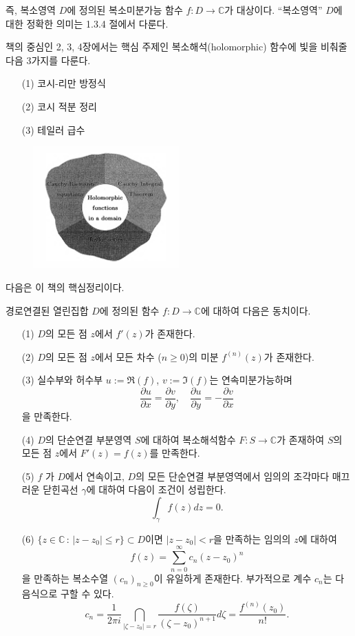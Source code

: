 즉, 복소영역 $D$에 정의된 복소미분가능 함수 $f \colon D\to \mathbb C$가 대상이다.
``복소영역'' $D$에 대한 정확한 의미는 1.3.4 절에서 다룬다.

책의 중심인 2, 3, 4장에서는 
핵심 주제인 복소해석(holomorphic) 함수에 빛을 비춰줄 다음 3가지를 다룬다.
\begin{enumerate}
\item[(1)] 코시-리만 방정식
\item[(2)] 코시 적분 정리
\item[(3)] 테일러 급수
\end{enumerate}

\begin{figure}[!h]
\begin{center}
\includegraphics[width=0.5\textwidth]{./SaltChapter/preface-fig-0-4}
\end{center}
\end{figure}

다음은 이 책의 핵심정리이다.

\begin{salt_theorem}
경로연결된 열린집합 $D$에 정의된 함수
$f:D\to \mathbb C$에 대하여 다음은 동치이다.
\begin{itemize}
\item[(1)] $D$의 모든 점 $z$에서 $f'(z)$가 존재한다.
\item[(2)] $D$의 모든 점 $z$에서 모든 차수 ($n\ge0$)의 미분  $f^{(n)}(z)$가 존재한다.
\item[(3)] 실수부와 허수부 $u:=\Re(f)$, $v:=\Im(f)$는 연속미분가능하며 
$$
\frac{\partial u}{\partial x} = \frac{\partial v}{\partial y},
\quad
\frac{\partial u}{\partial y} = - \frac{\partial v}{\partial x}
$$
을 만족한다.
\item[(4)] $D$의 단순연결 부분영역 $S$에 대하여 
복소해석함수 $ F: S\to \mathbb C$가 존재하여
$S$의 모든 점 $z$에서 $F'(z)= f(z)$를 만족한다.
\item[(5)] $ f$ 가 $D$에서 연속이고, 
$D$의 모든 단순연결 부분영역에서
임의의 조각마다 매끄러운 닫힌곡선 $\gamma$에 대하여 다음이 조건이 성립한다.
$$
\int_\gamma f(z)dz = 0.
$$
\item[(6)] $\{ z\in \mathbb C\,:\, |z-z_0| \le r \} \subset D$이면
$|z-z_0|<r$을 만족하는 임의의 $z$에 대하여
$$
f(z) = \sum_{n=0}^\infty c_n(z-z_0)^n
$$
을 만족하는 복소수열 $(c_n)_{n\ge0}$이 유일하게 존재한다.
부가적으로 계수 $c_n$는 다음식으로 구할 수 있다.
$$
c_n = \dfrac1{2\pi i} \dint_{|\zeta-z_0|=r} \frac{f(\zeta)}{(\zeta-z_0)^{n+1}}d\zeta = \dfrac{f^{(n)}(z_0)}{n!}.
$$
\end{itemize}
\end{salt_theorem}

